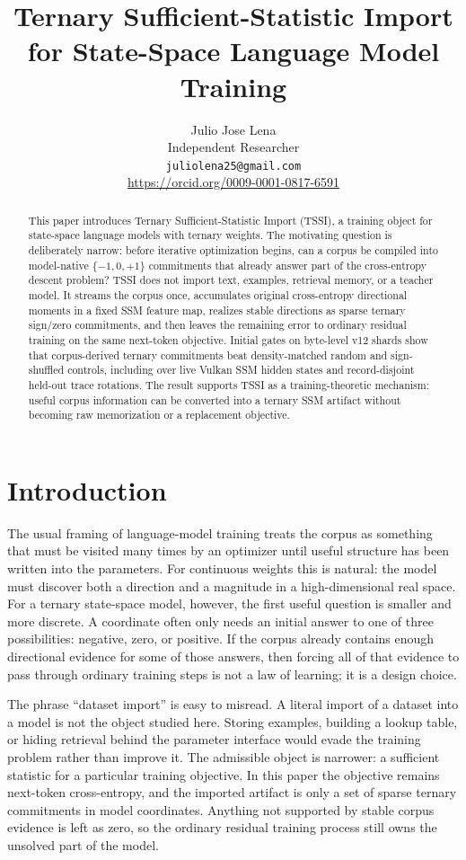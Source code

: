 \documentclass{article}
\title{Ternary Sufficient-Statistic Import for State-Space Language Model Training}
\author{
  Julio Jose Lena \\
  Independent Researcher \\
  \texttt{juliolena25@gmail.com} \\
  \url{https://orcid.org/0009-0001-0817-6591}
}
\begin{document}
\maketitle

\begin{abstract}
This paper introduces Ternary Sufficient-Statistic Import (TSSI), a training
object for state-space language models with ternary weights. The motivating
question is deliberately narrow: before iterative optimization begins, can a
corpus be compiled into model-native $\{-1,0,+1\}$ commitments that already
answer part of the cross-entropy descent problem? TSSI does not import text,
examples, retrieval memory, or a teacher model. It streams the corpus once,
accumulates original cross-entropy directional moments in a fixed SSM feature
map, realizes stable directions as sparse ternary sign/zero commitments, and
then leaves the remaining error to ordinary residual training on the same
next-token objective. Initial gates on byte-level v12 shards show that
corpus-derived ternary commitments beat density-matched random and
sign-shuffled controls, including over live Vulkan SSM hidden states and
record-disjoint held-out trace rotations. The result supports TSSI as a
training-theoretic mechanism: useful corpus information can be converted into a
ternary SSM artifact without becoming raw memorization or a replacement
objective.
\end{abstract}

\section{Introduction}

The usual framing of language-model training treats the corpus as something
that must be visited many times by an optimizer until useful structure has been
written into the parameters. For continuous weights this is natural: the model
must discover both a direction and a magnitude in a high-dimensional real
space. For a ternary state-space model, however, the first useful question is
smaller and more discrete. A coordinate often only needs an initial answer to
one of three possibilities: negative, zero, or positive. If the corpus already
contains enough directional evidence for some of those answers, then forcing
all of that evidence to pass through ordinary training steps is not a law of
learning; it is a design choice.

The phrase ``dataset import'' is easy to misread. A literal import of a
dataset into a model is not the object studied here. Storing examples, building
a lookup table, or hiding retrieval behind the parameter interface would evade
the training problem rather than improve it. The admissible object is narrower:
a sufficient statistic for a particular training objective. In this paper the
objective remains next-token cross-entropy, and the imported artifact is only a
set of sparse ternary commitments in model coordinates. Anything not supported
by stable corpus evidence is left as zero, so the ordinary residual training
process still owns the unsolved part of the model.
\end{document}

